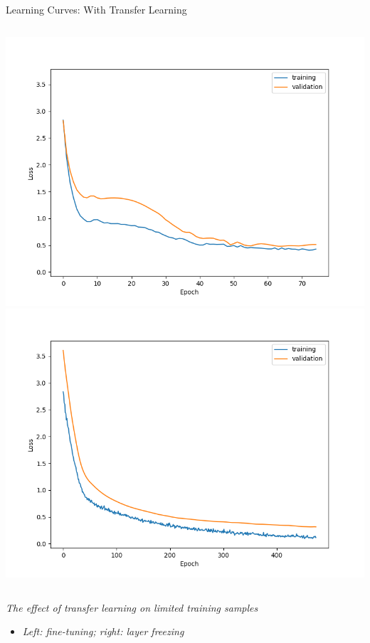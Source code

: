
\begin{frame}{Learning Curves: With Transfer Learning}
    \begin{columns}
    \includegraphics[height=0.8\textheight]{../project3/figures/figure1c.png}
    \includegraphics[height=0.8\textheight]{../project3/figures/figure1d.png}
    \end{columns}
    
    \textit{The effect of transfer learning on limited training samples}
    \begin{itemize}
        \item \textit{Left: fine-tuning; right: layer freezing}
    \end{itemize}
    \end{frame}
    
